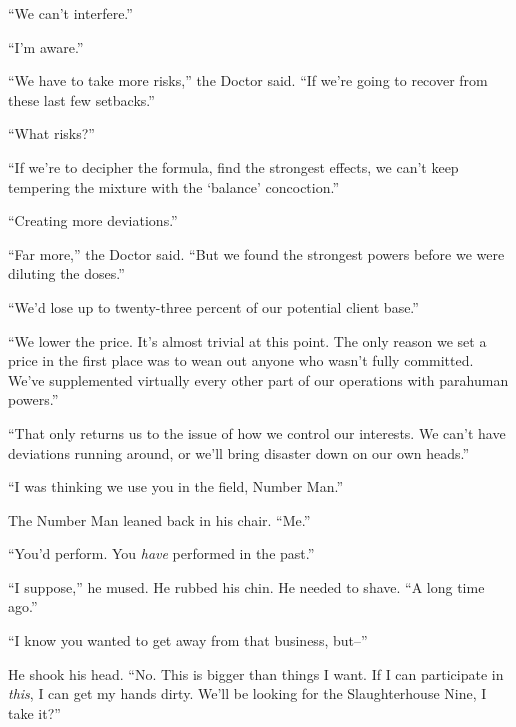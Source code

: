 ``We can't interfere.''



``I'm aware.''



``We have to take more risks,'' the Doctor said.  ``If we're going to recover from these last few setbacks.''



``What risks?''



``If we're to decipher the formula, find the strongest effects, we can't keep tempering the mixture with the `balance' concoction.''



``Creating more deviations.''



``Far more,'' the Doctor said.  ``But we found the strongest powers before we were diluting the doses.''



``We'd lose up to twenty-three percent of our potential client base.''



``We lower the price.  It's almost trivial at this point.  The only reason we set a price in the first place was to wean out anyone who wasn't fully committed.  We've supplemented virtually every other part of our operations with parahuman powers.''



``That only returns us to the issue of how we control our interests.  We can't have deviations running around, or we'll bring disaster down on our own heads.''



``I was thinking we use you in the field, Number Man.''



The Number Man leaned back in his chair.  ``Me.''



``You'd perform.  You \emph{have} performed in the past.''



``I suppose,'' he mused.  He rubbed his chin.  He needed to shave.  ``A long time ago.''



``I know you wanted to get away from that business, but--''



He shook his head.  ``No.  This is bigger than things I want.  If I can participate in \emph{this}, I can get my hands dirty.  We'll be looking for the Slaughterhouse Nine, I take it?''



